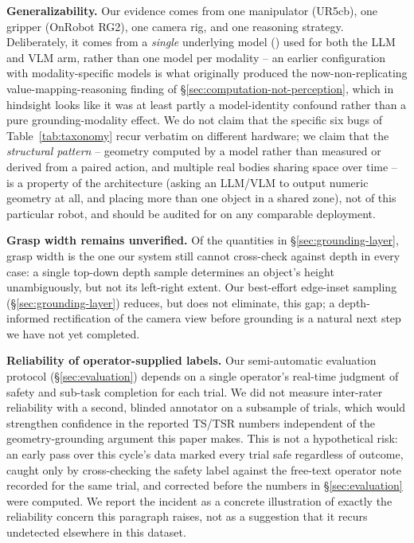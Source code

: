 \textbf{Generalizability.} Our evidence comes from one manipulator (UR5cb),
one gripper (OnRobot RG2), one camera rig, and one reasoning strategy.
Deliberately, it comes from a \emph{single} underlying model
() used for both the LLM and VLM arm, rather than one
model per modality -- an earlier configuration with modality-specific
models is what originally produced the now-non-replicating
value-mapping-reasoning finding of \S\ref{sec:computation-not-perception},
which in hindsight looks like it was at least partly a model-identity
confound rather than a pure grounding-modality effect. We do not claim
that the specific six bugs of Table~\ref{tab:taxonomy} recur verbatim on
different hardware; we claim that the \emph{structural pattern} --
geometry computed by a model rather than measured or derived from a
paired action, and multiple real bodies sharing space over time -- is a
property of the architecture (asking an LLM/VLM to output numeric
geometry at all, and placing more than one object in a shared zone), not
of this particular robot, and should be audited for on any comparable
deployment.

\textbf{Grasp width remains unverified.} Of the quantities in
\S\ref{sec:grounding-layer}, grasp width is the one our system still
cannot cross-check against depth in every case: a single top-down depth
sample determines an object's height unambiguously, but not its
left-right extent. Our best-effort edge-inset sampling
(\S\ref{sec:grounding-layer}) reduces, but does not eliminate, this gap;
a depth-informed rectification of the camera view before grounding is a
natural next step we have not yet completed.

\textbf{Reliability of operator-supplied labels.} Our semi-automatic
evaluation protocol (\S\ref{sec:evaluation}) depends on a single
operator's real-time judgment of safety and sub-task completion for each
trial. We did not measure inter-rater reliability with a second, blinded
annotator on a subsample of trials, which would strengthen confidence in
the reported TS/TSR numbers independent of the geometry-grounding
argument this paper makes. This is not a hypothetical risk: an early pass
over this cycle's data marked every trial safe regardless of outcome,
caught only by cross-checking the safety label against the free-text
operator note recorded for the same trial, and corrected before the
numbers in \S\ref{sec:evaluation} were computed. We report the incident
as a concrete illustration of exactly the reliability concern this
paragraph raises, not as a suggestion that it recurs undetected
elsewhere in this dataset.
